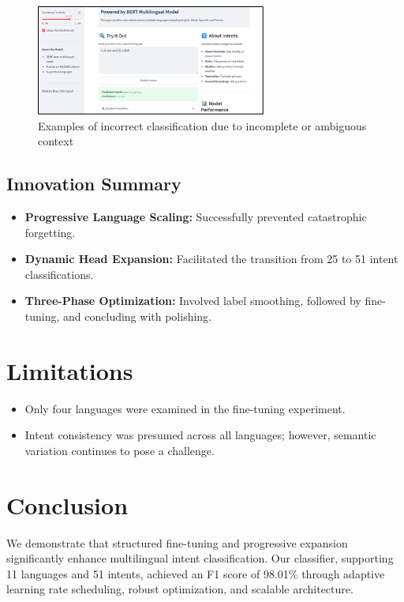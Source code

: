 \documentclass{ecai}
\begin{document}
\begin{enumerate}
    \begin{figure}[H]
    \centering
    \includegraphics[width=0.7\linewidth]{result4.png}
    \caption{Examples of incorrect classification due to incomplete or ambiguous context}
    \end{figure}
\end{enumerate}

\subsection{Innovation Summary}
\begin{itemize}
    \item \textbf{Progressive Language Scaling:} Successfully prevented catastrophic forgetting.
    \item \textbf{Dynamic Head Expansion:} Facilitated the transition from 25 to 51 intent classifications.
    \item \textbf{Three-Phase Optimization:} Involved label smoothing, followed by fine-tuning, and concluding with polishing.
\end{itemize}

\section{Limitations}
\begin{itemize}
    \item Only four languages were examined in the fine-tuning experiment.
    \item Intent consistency was presumed across all languages; however, semantic variation continues to pose a challenge.
\end{itemize}

\section{Conclusion}
We demonstrate that structured fine-tuning and progressive expansion significantly enhance multilingual intent classification. Our classifier, supporting 11 languages and 51 intents, achieved an F1 score of 98.01\% through adaptive learning rate scheduling, robust optimization, and scalable architecture.
\end{document}
